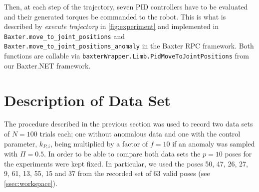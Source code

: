 \documentclass{scrartcl}
\newcommand{\baxterdotnet}{Baxter.NET\xspace}
\newcommand{\baxterrpc}{Baxter RPC\xspace}
\begin{document}
        Then, at each step of the trajectory, seven PID controllers have to be evaluated and their generated torques be commanded to the robot.
        This is what is described by \emph{execute trajectory} in \cref{fig:experiment} and implemented in \verb|Baxter.move_to_joint_positions| and \verb|Baxter.move_to_joint_positions_anomaly| in the \baxterrpc framework.
        Both functions are callable via \verb|baxterWrapper.Limb.PidMoveToJointPositions| from our \baxterdotnet framework.
    
\section{Description of Data Set}
    The procedure described in the previous section was used to record two data sets of $N=100$ trials each; one without anomalous data and one with the control parameter, $k_{P,i}$, being multiplied by a factor of $f=10$ if an anomaly was sampled with $\Pi = 0.5$.
    In order to be able to compare both data sets the $p=10$ poses for the experiments were kept fixed.
    In particular, we used the poses 50, 47, 26, 27, 9, 61, 13, 55, 15 and 37 from the recorded set of 63 valid poses (see \cref{ssec:workspace}).
    
\end{document}
